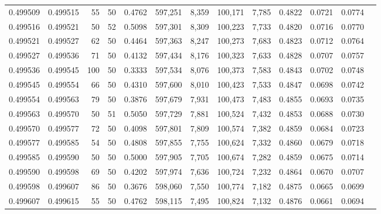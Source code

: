 \begin{tabular}{rrrrrrrrrrrrr}
0.499509 & 0.499515 &    55 &  50 &                                     0.4762 & 597,251 &   8,359 & 100,171 &   7,785 & 0.4822 & 0.0721 & 0.0774 \\
0.499516 & 0.499521 &    50 &  52 &                                     0.5098 & 597,301 &   8,309 & 100,223 &   7,733 & 0.4820 & 0.0716 & 0.0770 \\
0.499521 & 0.499527 &    62 &  50 &                                     0.4464 & 597,363 &   8,247 & 100,273 &   7,683 & 0.4823 & 0.0712 & 0.0764 \\
0.499527 & 0.499536 &    71 &  50 &                                     0.4132 & 597,434 &   8,176 & 100,323 &   7,633 & 0.4828 & 0.0707 & 0.0757 \\
0.499536 & 0.499545 &   100 &  50 &                                     0.3333 & 597,534 &   8,076 & 100,373 &   7,583 & 0.4843 & 0.0702 & 0.0748 \\
0.499545 & 0.499554 &    66 &  50 &                                     0.4310 & 597,600 &   8,010 & 100,423 &   7,533 & 0.4847 & 0.0698 & 0.0742 \\
0.499554 & 0.499563 &    79 &  50 &                                     0.3876 & 597,679 &   7,931 & 100,473 &   7,483 & 0.4855 & 0.0693 & 0.0735 \\
0.499563 & 0.499570 &    50 &  51 &                                     0.5050 & 597,729 &   7,881 & 100,524 &   7,432 & 0.4853 & 0.0688 & 0.0730 \\
0.499570 & 0.499577 &    72 &  50 &                                     0.4098 & 597,801 &   7,809 & 100,574 &   7,382 & 0.4859 & 0.0684 & 0.0723 \\
0.499577 & 0.499585 &    54 &  50 &                                     0.4808 & 597,855 &   7,755 & 100,624 &   7,332 & 0.4860 & 0.0679 & 0.0718 \\
0.499585 & 0.499590 &    50 &  50 &                                     0.5000 & 597,905 &   7,705 & 100,674 &   7,282 & 0.4859 & 0.0675 & 0.0714 \\
0.499590 & 0.499598 &    69 &  50 &                                     0.4202 & 597,974 &   7,636 & 100,724 &   7,232 & 0.4864 & 0.0670 & 0.0707 \\
0.499598 & 0.499607 &    86 &  50 &                                     0.3676 & 598,060 &   7,550 & 100,774 &   7,182 & 0.4875 & 0.0665 & 0.0699 \\
0.499607 & 0.499615 &    55 &  50 &                                     0.4762 & 598,115 &   7,495 & 100,824 &   7,132 & 0.4876 & 0.0661 & 0.0694 \\

\end{tabular}
